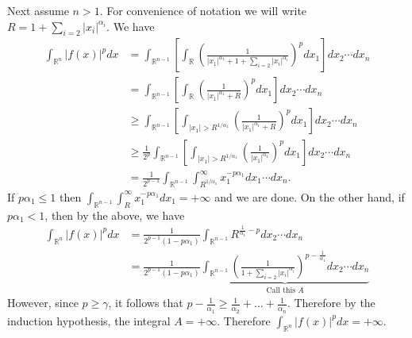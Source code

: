 \documentclass[answers]{exam}
\theoremstyle{problemstyle}
\newcommand{\1}[1]{\textbf{1}_{\left[#1\right]}} %
\def\R{\mathbb{R}} %
\begin{document}
\begin{questions}
\begin{solution}
Next assume $n>1$. For convenience of notation we will write $R=1+ \sum_{i=2}|x_{i}|^{\alpha_{i}}$. We have
\begin{align*}
  \int_{\R^{n}}|f(x)|^{p}dx
  &= \int_{\R^{n-1}} \left[ \int_{\R} \left( \frac{1}{|x_{1}|^{\alpha_{1}}+ 1+ \sum_{i=2}|x_{i}|^{\alpha_{i}}} \right)^{p}dx_{1} \right]dx_{2}\cdots dx_{n}\\
  &=\int_{\R^{n-1}} \left[ \int_{\R} \left( \frac{1}{|x_{1}|^{\alpha_{1}}+ R} \right)^{p}dx_{1} \right]dx_{2}\cdots dx_{n}\\
  &\geq \int_{\R^{n-1}} \left[ \int_{|x_{1}|>R^{1/\alpha_{1}}} \left( \frac{1}{|x_{1}|^{\alpha_{1}}+ R} \right)^{p}dx_{1} \right]dx_{2}\cdots dx_{n}\\
  &\geq \frac{1}{2^{p}}\int_{\R^{n-1}} \left[ \int_{|x_{1}|>R^{1/\alpha_{1}}} \left( \frac{1}{|x_{1}|^{\alpha_{1}}} \right)^{p}dx_{1} \right]dx_{2}\cdots dx_{n}\\
  &= \frac{1}{2^{p-1}}\int_{\R^{n-1}} \int_{R^{1/\alpha_{1}}}^{\infty}x_{1}^{-p\alpha_{1}}dx_{1}\cdots dx_{n}.
\end{align*}
If $p\alpha_{1}\leq 1$ then $\int_{\R^{n-1}} \int_{R}^{\infty}x_{1}^{-p\alpha_{1}}dx_{1}= +\infty$ and we are done. On the other hand, if $p\alpha_{1}<1$, then by the above, we have
\begin{align*}
  \int_{\R^{n}}|f(x)|^{p}dx
  &= \frac{1}{2^{p-1}(1-p\alpha_{1})}\int_{\R^{n-1}} R^{\frac{1}{\alpha_{1}}-p}dx_{2}\cdots dx_{n}\\
  &= \frac{1}{2^{p-1}(1-p\alpha_{1})}\underbrace{\int_{\R^{n-1}} \left( \frac{1}{1+ \sum_{i=2}|x_{i}|^{\alpha_{i}}}
    \right)^{p-\frac{1}{\alpha_{1}}} dx_{2}\cdots dx_{n}}_{\text{Call this }A}
\end{align*}
However, since $p\geq \gamma$, it follows that $p-\frac{1}{\alpha_{1}}\geq \frac{1}{\alpha_{2}}+ \ldots + \frac{1}{\alpha_{n}}.$ Therefore by the induction hypothesis, the integral $A=+\infty$. Therefore $\int_{\R^{n}}|f(x)|^{p}dx = +\infty$.
\end{solution}



\end{questions}
\end{document}
